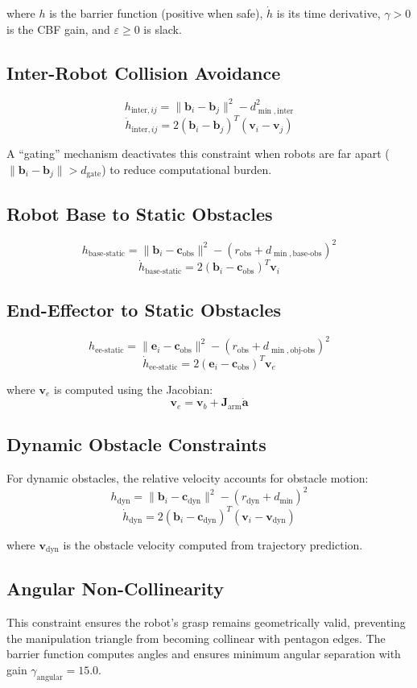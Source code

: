 \documentclass[12pt,a4paper]{article}
\begin{document}
where $h$ is the barrier function (positive when safe), $\dot{h}$ is its time derivative, $\gamma > 0$ is the CBF gain, and $\varepsilon \geq 0$ is slack.

\subsection{Inter-Robot Collision Avoidance}
\[
h_{\text{inter},ij} = \|\mathbf{b}_i - \mathbf{b}_j\|^2 - d_{\min,\text{inter}}^2
\]
\[
\dot{h}_{\text{inter},ij} = 2(\mathbf{b}_i - \mathbf{b}_j)^T(\mathbf{v}_i - \mathbf{v}_j)
\]

A ``gating'' mechanism deactivates this constraint when robots are far apart ($\|\mathbf{b}_i - \mathbf{b}_j\| > d_{\text{gate}}$) to reduce computational burden.

\subsection{Robot Base to Static Obstacles}
\[
h_{\text{base-static}} = \|\mathbf{b}_i - \mathbf{c}_{\text{obs}}\|^2 - (r_{\text{obs}} + d_{\min,\text{base-obs}})^2
\]
\[
\dot{h}_{\text{base-static}} = 2(\mathbf{b}_i - \mathbf{c}_{\text{obs}})^T \mathbf{v}_i
\]

\subsection{End-Effector to Static Obstacles}
\[
h_{\text{ee-static}} = \|\mathbf{e}_i - \mathbf{c}_{\text{obs}}\|^2 - (r_{\text{obs}} + d_{\min,\text{obj-obs}})^2
\]
\[
\dot{h}_{\text{ee-static}} = 2(\mathbf{e}_i - \mathbf{c}_{\text{obs}})^T \mathbf{v}_e
\]

where $\mathbf{v}_e$ is computed using the Jacobian:
\[
\mathbf{v}_e = \mathbf{v}_b + \mathbf{J}_{\text{arm}} \dot{\mathbf{a}}
\]

\subsection{Dynamic Obstacle Constraints}
For dynamic obstacles, the relative velocity accounts for obstacle motion:
\[
h_{\text{dyn}} = \|\mathbf{b}_i - \mathbf{c}_{\text{dyn}}\|^2 - (r_{\text{dyn}} + d_{\min})^2
\]
\[
\dot{h}_{\text{dyn}} = 2(\mathbf{b}_i - \mathbf{c}_{\text{dyn}})^T(\mathbf{v}_i - \mathbf{v}_{\text{dyn}})
\]

where $\mathbf{v}_{\text{dyn}}$ is the obstacle velocity computed from trajectory prediction.

\subsection{Angular Non-Collinearity}
This constraint ensures the robot's grasp remains geometrically valid, preventing the manipulation triangle from becoming collinear with pentagon edges. The barrier function computes angles and ensures minimum angular separation with gain $\gamma_{\text{angular}} = 15.0$.
\end{document}
